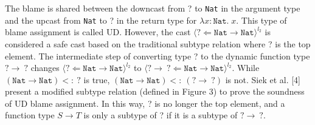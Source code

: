 The blame is shared between the downcast from ? to \texttt{Nat} in the argument type 
and the upcast from \texttt{Nat} to ? in the return type for $\lambda x \! : \! \texttt{Nat} . \; x$. 
This type of blame assignment is called UD. 
However, the cast $\langle ? \Leftarrow \texttt{Nat} \rightarrow \texttt{Nat} \rangle ^{l_2}$ 
is considered a safe cast based on the traditional subtype relation where 
? is the top element. The intermediate step of converting type ? to 
the dynamic function type $ ? \rightarrow \: ?$ changes $\langle ? \Leftarrow \texttt{Nat} 
\rightarrow \texttt{Nat} \rangle ^{l_2}$ to
$\langle ? \rightarrow \: ? \Leftarrow \texttt{Nat} \rightarrow \texttt{Nat} \rangle ^{l_2}$. While  
$(\texttt{Nat} \rightarrow \texttt{Nat}) <: \: ?$ is true,    
$(\texttt{Nat} \rightarrow \texttt{Nat}) <: \: (? \rightarrow \: ?)$ is not. Siek et al. [4] 
present a modified subtype relation (defined in Figure 3) to prove the soundness of UD 
blame assignment. In this way, ? is no longer the top element, and a function type $S \rightarrow T$ 
is only a subtype of ? if it is a subtype of $ ? \rightarrow \: ?$. 

